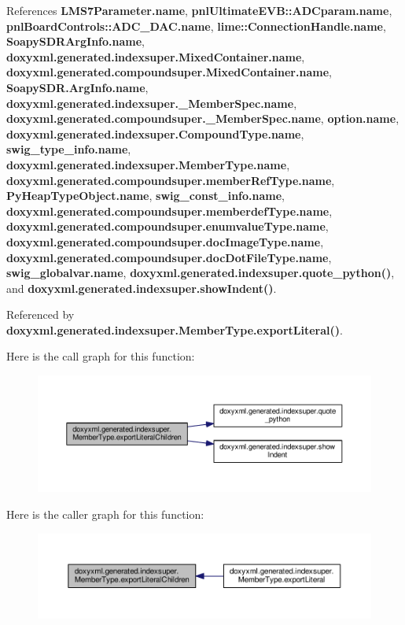 References {\bf L\+M\+S7\+Parameter.\+name}, {\bf pnl\+Ultimate\+E\+V\+B\+::\+A\+D\+Cparam.\+name}, {\bf pnl\+Board\+Controls\+::\+A\+D\+C\+\_\+\+D\+A\+C.\+name}, {\bf lime\+::\+Connection\+Handle.\+name}, {\bf Soapy\+S\+D\+R\+Arg\+Info.\+name}, {\bf doxyxml.\+generated.\+indexsuper.\+Mixed\+Container.\+name}, {\bf doxyxml.\+generated.\+compoundsuper.\+Mixed\+Container.\+name}, {\bf Soapy\+S\+D\+R.\+Arg\+Info.\+name}, {\bf doxyxml.\+generated.\+indexsuper.\+\_\+\+Member\+Spec.\+name}, {\bf doxyxml.\+generated.\+compoundsuper.\+\_\+\+Member\+Spec.\+name}, {\bf option.\+name}, {\bf doxyxml.\+generated.\+indexsuper.\+Compound\+Type.\+name}, {\bf swig\+\_\+type\+\_\+info.\+name}, {\bf doxyxml.\+generated.\+indexsuper.\+Member\+Type.\+name}, {\bf doxyxml.\+generated.\+compoundsuper.\+member\+Ref\+Type.\+name}, {\bf Py\+Heap\+Type\+Object.\+name}, {\bf swig\+\_\+const\+\_\+info.\+name}, {\bf doxyxml.\+generated.\+compoundsuper.\+memberdef\+Type.\+name}, {\bf doxyxml.\+generated.\+compoundsuper.\+enumvalue\+Type.\+name}, {\bf doxyxml.\+generated.\+compoundsuper.\+doc\+Image\+Type.\+name}, {\bf doxyxml.\+generated.\+compoundsuper.\+doc\+Dot\+File\+Type.\+name}, {\bf swig\+\_\+globalvar.\+name}, {\bf doxyxml.\+generated.\+indexsuper.\+quote\+\_\+python()}, and {\bf doxyxml.\+generated.\+indexsuper.\+show\+Indent()}.



Referenced by {\bf doxyxml.\+generated.\+indexsuper.\+Member\+Type.\+export\+Literal()}.



Here is the call graph for this function\+:
\nopagebreak
\begin{figure}[H]
\begin{center}
\leavevmode
\includegraphics[width=350pt]{d0/da4/classdoxyxml_1_1generated_1_1indexsuper_1_1MemberType_ad71a8b79751a2308889b09b5f82970a3_cgraph}
\end{center}
\end{figure}




Here is the caller graph for this function\+:
\nopagebreak
\begin{figure}[H]
\begin{center}
\leavevmode
\includegraphics[width=350pt]{d0/da4/classdoxyxml_1_1generated_1_1indexsuper_1_1MemberType_ad71a8b79751a2308889b09b5f82970a3_icgraph}
\end{center}
\end{figure}


